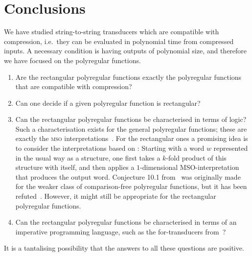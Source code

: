 \documentclass[a4paper,UKenglish,cleveref, autoref, thm-restate]{lipics-v2021}
\newcommand{\mso}{{\textsc{mso}}\xspace}
\begin{document}
\section{Conclusions}
We have studied string-to-string transducers which are compatible with compression, i.e.~they can be evaluated in polynomial time from compressed inputs. A necessary condition is having outputs of polynomial size, and therefore we have focused on the polyregular functions. 
\begin{enumerate}
    \item Are the rectangular polyregular functions exactly the polyregular functions that are compatible with compression? 
    \item Can one decide if a given polyregular function is rectangular?
    \item Can the rectangular polyregular functions be characterised in terms of logic? Such a characterisation exists for the  general polyregular functions; these  are exactly the \mso interpretations~\cite[Theorem 7]{msoInterpretations}. For the rectangular ones a promising idea is to consider the interpretations based on \cite[Conjecture 10.1]{NguyenNP21}:
Starting with a word $w$ represented in the usual way as a structure, one first takes a $k$-fold product 
of this structure with itself, and then applies a $1$-dimensional MSO-interpretation that produces the output word.
Conjecture 10.1 from~\cite{NguyenNP21}
 was originally made for the weaker class of comparison-free polyregular functions, but it has been refuted~\cite[Theorem 4.6]{kiefer2023refutations}. However, it might still be appropriate for the rectangular polyregular functions.
    \item  Can the rectangular polyregular functions be characterised in terms of an  imperative programming language, such as the for-transducers from~\cite[Section 1]{polyregular-survey}?
\end{enumerate}
It is a tantalising possibility that the answers to all these questions are positive.


\end{document}
